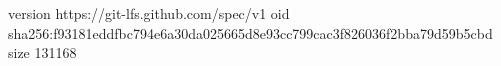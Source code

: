 version https://git-lfs.github.com/spec/v1
oid sha256:f93181eddfbc794e6a30da025665d8e93cc799cac3f826036f2bba79d59b5cbd
size 131168
